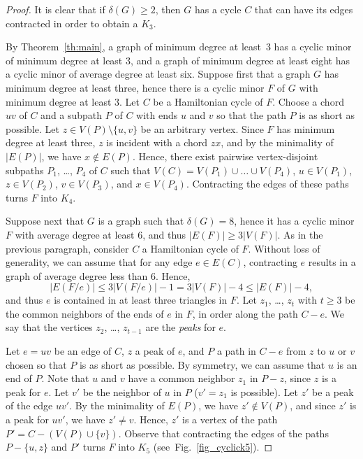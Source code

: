 \documentclass[11pt]{article}
\begin{document}
\begin{proof}
It is clear that if $\delta(G)\geq 2$, then $G$ has a cycle $C$ that can have its edges contracted in order to obtain a $K_3$.

 By Theorem~\ref{th:main}, a graph of minimum degree at least~$3$ has a cyclic minor of minimum degree at least $3$, and a graph of minimum degree at least eight has a cyclic minor of average degree at least six.
Suppose first that a graph $G$ has minimum degree at least three, hence there is a cyclic minor $F$ of $G$ with minimum degree at least $3$. Let $C$ be a Hamiltonian cycle of $F$. Choose a chord $uv$ of $C$ and a subpath $P$ of $C$ with ends $u$ and $v$ so that the path $P$ is as short as possible.
Let $z\in V(P)\setminus\{u,v\}$ be an arbitrary vertex.  Since $F$ has minimum degree at least three,
$z$ is incident with a chord $zx$, and by the minimality of $|E(P)|$, we have $x\not\in E(P)$.
Hence, there exist pairwise vertex-disjoint subpaths $P_1$, \ldots, $P_4$ of $C$ such that
$V(C)=V(P_1)\cup\ldots\cup V(P_4)$, $u\in V(P_1)$, $z\in V(P_2)$, $v\in V(P_3)$, and $x\in V(P_4)$.
Contracting the edges of these paths turns $F$ into $K_4$.

Suppose next that $G$ is a graph such that $\delta(G)= 8$, hence it has a cyclic minor $F$ with average degree at least $6$, and thus $|E(F)|\ge 3|V(F)|$. As in the previous paragraph, consider $C$ a Hamiltonian cycle of $F$.  Without loss of generality, we can assume that
for any edge $e\in E(C)$, contracting $e$ results in a graph of average degree less than $6$.
Hence,
$$|E(F/e)|\le 3|V(F/e)|-1=3|V(F)|-4\le |E(F)|-4,$$
and thus $e$ is contained in at least three triangles in $F$.  Let $z_1$, \ldots, $z_t$ with $t\ge 3$
be the common neighbors of the ends of $e$ in $F$, in order along the path $C-e$.  We say that the vertices $z_2$, \ldots, $z_{t-1}$
are the \emph{peaks} for $e$.

Let $e=uv$ be an edge of $C$, $z$ a peak of $e$, and $P$ a path in $C-e$ from $z$ to $u$ or $v$ chosen so that $P$ is as short as possible.  By symmetry, we can assume that $u$ is an end of $P$.  Note that $u$ and $v$ have a common neighbor $z_1$ in $P-z$, since $z$ is a peak for $e$.  Let $v'$ be the neighbor of $u$ in $P$ ($v'=z_1$ is possible). Let $z'$ be a peak of the edge $uv'$.  By the minimality of $E(P)$, we have $z'\not\in V(P)$, and since $z'$ is a peak for $uv'$, we have $z'\neq v$.  Hence, $z'$ is a vertex of the path $P'=C-(V(P)\cup\{v\})$.  Observe that contracting the edges of the paths $P-\{u,z\}$ and $P'$ turns $F$ into $K_5$ (see~Fig.~\ref{fig_cyclick5}).
\end{proof}
\end{document}

